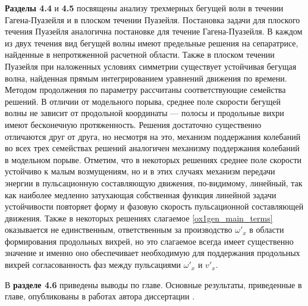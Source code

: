 \textbf{Разделы 4.4} и \textbf{4.5} посвящены анализу трехмерных бегущей волн в течении Гагена-Пуазейля и в плоском течении Пуазейля. Постановка задачи для плоского течения Пуазейля аналогична постановке для течение Гагена-Пуазейля. В каждом из двух течения вид бегущей волны имеют предельные решения на сепаратрисе, найденные в непротяженной расчетной области. Также в плоском течении Пуазейля при наложенных условиях симметрии существует устойчивая бегущая волна, найденная прямым интегрированием уравнений движения по времени. Методом продолжения по параметру рассчитаны соответствующие семейства решений. В отличии от модельного порыва, среднее поле скорости бегущей волны не зависит от продольной координаты --- полосы и продольные вихри имеют бесконечную протяженность. Решения достаточно существенно отличаются друг от друга, но несмотря на это, механизм поддержания колебаний во всех трех семействах решений аналогичен механизму поддержания колебаний в модельном порыве. Отметим, что в некоторых решениях среднее поле скорости устойчиво к малым возмущениям, но и в этих случаях механизм передачи энергии в пульсационную составляющую движения, по-видимому, линейный, так как наиболее медленно затухающая собственная функция линейной задачи устойчивости повторяет форму и фазовую скорость пульсационной составляющей движения. Также в некоторых решениях слагаемое \eqref{ox1gen_main_terms} оказывается не единственным, ответственным за производство $\omega'_x$ в области формирования продольных вихрей, но это слагаемое всегда имеет существенно значение и именно оно обеспечивает необходимую для поддержания продольных вихрей согласованность фаз между пульсациями $\omega'_x$ и $v'_x$. 

В \textbf{разделе 4.6} приведены выводы по главе. Основные результаты, приведенные в главе, опубликованы в работах автора диссертации \cite{Vest18, KMU2016}. 


